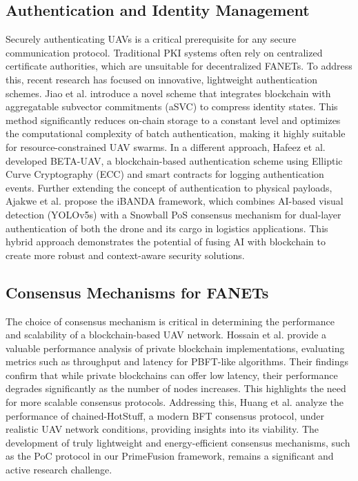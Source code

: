 \subsection{Authentication and Identity Management}
Securely authenticating UAVs is a critical prerequisite for any secure communication protocol. Traditional PKI systems often rely on centralized certificate authorities, which are unsuitable for decentralized FANETs. To address this, recent research has focused on innovative, lightweight authentication schemes. Jiao et al. \cite{jiao2025lightweight} introduce a novel scheme that integrates blockchain with aggregatable subvector commitments (aSVC) to compress identity states. This method significantly reduces on-chain storage to a constant level and optimizes the computational complexity of batch authentication, making it highly suitable for resource-constrained UAV swarms. In a different approach, Hafeez et al. \cite{hafeez2024beta} developed BETA-UAV, a blockchain-based authentication scheme using Elliptic Curve Cryptography (ECC) and smart contracts for logging authentication events. Further extending the concept of authentication to physical payloads, Ajakwe et al. \cite{ajakwe2025ibanda} propose the iBANDA framework, which combines AI-based visual detection (YOLOv5s) with a Snowball PoS consensus mechanism for dual-layer authentication of both the drone and its cargo in logistics applications. This hybrid approach demonstrates the potential of fusing AI with blockchain to create more robust and context-aware security solutions.

\subsection{Consensus Mechanisms for FANETs}
The choice of consensus mechanism is critical in determining the performance and scalability of a blockchain-based UAV network. Hossain et al. \cite{hossain2024blockchain} provide a valuable performance analysis of private blockchain implementations, evaluating metrics such as throughput and latency for PBFT-like algorithms. Their findings confirm that while private blockchains can offer low latency, their performance degrades significantly as the number of nodes increases. This highlights the need for more scalable consensus protocols. Addressing this, Huang et al. \cite{huang2025performance} analyze the performance of chained-HotStuff, a modern BFT consensus protocol, under realistic UAV network conditions, providing insights into its viability. The development of truly lightweight and energy-efficient consensus mechanisms, such as the PoC protocol in our PrimeFusion framework, remains a significant and active research challenge.

